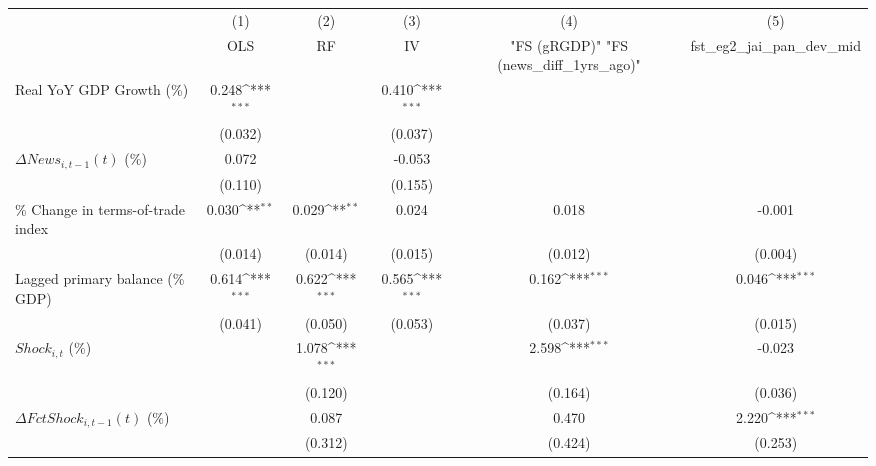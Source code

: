 {
\def\sym#1{\ifmmode^{#1}\else\(^{#1}\)\fi}
\begin{tabular}{l*{5}{c}}
\toprule
                    &\multicolumn{1}{c}{(1)}&\multicolumn{1}{c}{(2)}&\multicolumn{1}{c}{(3)}&\multicolumn{1}{c}{(4)}&\multicolumn{1}{c}{(5)}\\
                    &\multicolumn{1}{c}{OLS}&\multicolumn{1}{c}{RF}&\multicolumn{1}{c}{IV}&\multicolumn{1}{c}{ "FS (gRGDP)"  "FS (news_diff_1yrs_ago)" }&\multicolumn{1}{c}{fst_eg2_jai_pan_dev_mid}\\
\midrule
Real YoY GDP Growth (\%)&       0.248\sym{***}&                     &       0.410\sym{***}&                     &                     \\
                    &     (0.032)         &                     &     (0.037)         &                     &                     \\
\addlinespace
$ \Delta News_{i,t-1}(t)$ (\%)&       0.072         &                     &      -0.053         &                     &                     \\
                    &     (0.110)         &                     &     (0.155)         &                     &                     \\
\addlinespace
\% Change in terms-of-trade index&       0.030\sym{**} &       0.029\sym{**} &       0.024         &       0.018         &      -0.001         \\
                    &     (0.014)         &     (0.014)         &     (0.015)         &     (0.012)         &     (0.004)         \\
\addlinespace
Lagged primary balance (\% GDP)&       0.614\sym{***}&       0.622\sym{***}&       0.565\sym{***}&       0.162\sym{***}&       0.046\sym{***}\\
                    &     (0.041)         &     (0.050)         &     (0.053)         &     (0.037)         &     (0.015)         \\
\addlinespace
$ Shock_{i,t}$ (\%) &                     &       1.078\sym{***}&                     &       2.598\sym{***}&      -0.023         \\
                    &                     &     (0.120)         &                     &     (0.164)         &     (0.036)         \\
\addlinespace
$ \Delta FctShock_{i,t-1}(t)$ (\%)&                     &       0.087         &                     &       0.470         &       2.220\sym{***}\\
                    &                     &     (0.312)         &                     &     (0.424)         &     (0.253)         \\

\end{tabular}}
